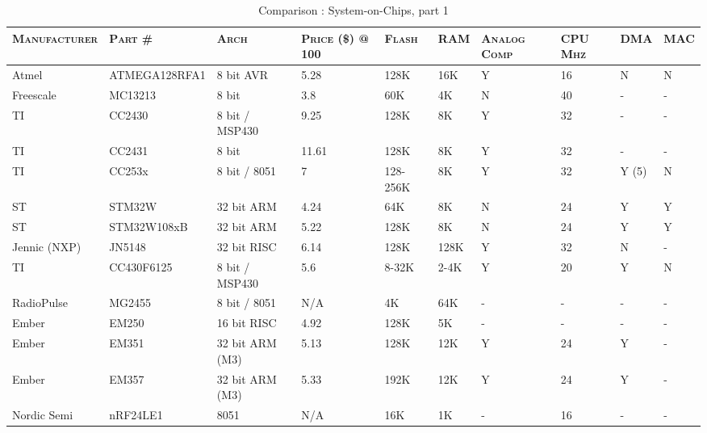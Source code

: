 
   \begin{sidewaystable}[h]
     \centering
     \begin{tabularx}{0.9\textwidth}{l l l p{1.5cm} l l  p{1.3cm} p{1.3cm} l l}
       \toprule
      \textsc{Manufacturer}
      & \textsc{Part \#}
      & \textsc{Arch}
      & \textsc{Price (\$) @ 100}
      & \textsc{Flash}
      & \textsc{RAM}
      & \textsc{Analog Comp}
      & \textsc{CPU Mhz}
      & \textsc{DMA}
      & \textsc{MAC}
 \\ \hline
        Atmel        & ATMEGA128RFA1 & 8 bit AVR       & 5.28    & 128K     & 16K  & Y &  16      & N     & N   \\ 
        Freescale    & MC13213       & 8 bit           & 3.8     & 60K      & 4K   & N &  40      & -     & -   \\ 
        TI           & CC2430        & 8 bit / MSP430  & 9.25    & 128K     & 8K   & Y &  32      & -     & -   \\ 
        TI           & CC2431        & 8 bit           & 11.61   & 128K     & 8K   & Y &  32      & -     & -   \\ 
        TI           & CC253x        & 8 bit / 8051    & 7       & 128-256K & 8K   & Y &  32      & Y (5) & N   \\ 
        ST           & STM32W        & 32 bit ARM      & 4.24    & 64K      & 8K   & N &  24      & Y     & Y   \\ 
        ST           & STM32W108xB   & 32 bit ARM      & 5.22    & 128K     & 8K   & N &  24      & Y     & Y   \\ 
        Jennic (NXP) & JN5148        & 32 bit RISC     & 6.14    & 128K     & 128K & Y &  32      & N     & -   \\ 
        TI           & CC430F6125    & 8 bit / MSP430  & 5.6     & 8-32K    & 2-4K & Y &  20      & Y     & N   \\ 
        RadioPulse   & MG2455        & 8 bit / 8051    & N/A     & 4K       & 64K  & - &  -       & -     & -   \\ 
        Ember        & EM250         & 16 bit RISC     & 4.92    & 128K     & 5K   & - &  -       & -     & -   \\ 
        Ember        & EM351         & 32 bit ARM (M3) & 5.13    & 128K     & 12K  & Y &  24      & Y     & -   \\ 
        Ember        & EM357         & 32 bit ARM (M3) & 5.33    & 192K     & 12K  & Y &  24      & Y     & -   \\ 
        Nordic Semi  & nRF24LE1      & 8051            & N/A     & 16K      & 1K   & - &  16      & -     & -   \\

        \bottomrule
     \end{tabularx}
     \caption{Comparison : System-on-Chips, part 1}
     \label{tab:soc-comparison}
   \end{sidewaystable}

